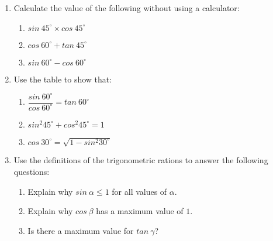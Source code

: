 \begin{exercises}{}{
\begin{enumerate}[itemsep=6pt, label=\textbf{\arabic*}. ] 
\item Calculate the value of the following without using a calculator:
\begin{enumerate}[noitemsep, label=\textbf{(\alph*)} ]
\item $sin~ 45^{\circ} \times cos~ 45^{\circ}$
\item $cos~ 60^{\circ} + tan~ 45^{\circ}$
\item $sin~ 60^{\circ} - cos~ 60^{\circ}$
\end{enumerate}
\item Use the table to  show that:
\begin{enumerate}[itemsep=5pt, label=\textbf{(\alph*)} ]
\item $\dfrac{sin~ 60^{\circ}}{cos~ 60^{\circ}} = tan~ 60^{\circ} $
\item $sin^{2} 45^{\circ}+ cos^{2} 45^{\circ} =1 $
\item $cos~ 30^{\circ} =\sqrt{1- sin^{2} 30^{\circ}}$
\end{enumerate}
\item Use the definitions of the trigonometric rations to answer the following questions:
\begin{enumerate}[noitemsep, label=\textbf{(\alph*)} ]
\item Explain why $sin ~\alpha \leq 1$ for all values of $\alpha$.
\item Explain why $cos~ \beta$ has a maximum value of $1$.
\item Is there a maximum value for $tan~\gamma$?
\end{enumerate}
\end{enumerate}
}
\end{exercises}


